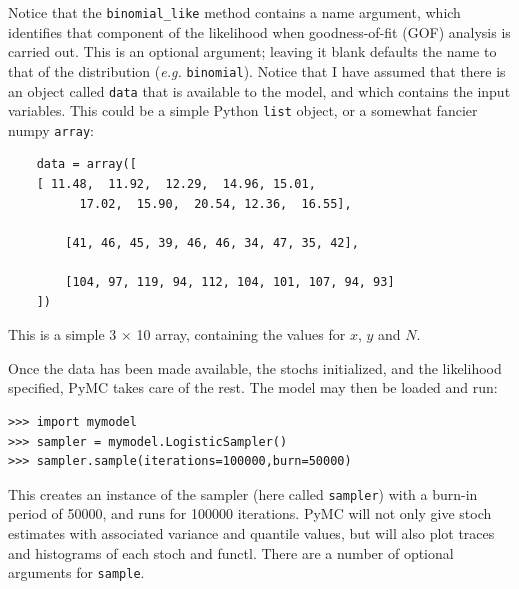 \documentclass[]{book}
\begin{document}
Notice that the \verb=binomial_like= method contains a name argument, which identifies that component of the likelihood when goodness-of-fit (GOF) analysis is carried out. This is an optional argument; leaving it blank defaults the name to that of the distribution (\emph{e.g.} \verb=binomial=). Notice that I have assumed that there is an object called \verb=data= that is available to the model, and which contains the input variables. This could be a simple Python \verb=list= object, or a somewhat fancier numpy \verb=array=:

\begin{verbatim}
    data = array([
    [ 11.48,  11.92,  12.29,  14.96, 15.01,
          17.02,  15.90,  20.54, 12.36,  16.55],

        [41, 46, 45, 39, 46, 46, 34, 47, 35, 42],

        [104, 97, 119, 94, 112, 104, 101, 107, 94, 93]
    ])
\end{verbatim}
This is a simple 3 $\times$ 10 array, containing the values for $x$, $y$ and $N$.

Once the data has been made available, the stochs initialized, and the likelihood specified, PyMC takes care of the rest. The model may then be loaded and run:
\begin{verbatim}
>>> import mymodel
>>> sampler = mymodel.LogisticSampler()
>>> sampler.sample(iterations=100000,burn=50000)
\end{verbatim}
This creates an instance of the sampler (here called \verb=sampler=) with a burn-in period of 50000, and runs for 100000 iterations. PyMC will not only give stoch estimates with associated variance and quantile values, but will also plot traces and histograms of each stoch and functl. There are a number of optional arguments for \verb=sample=.
\end{document}
